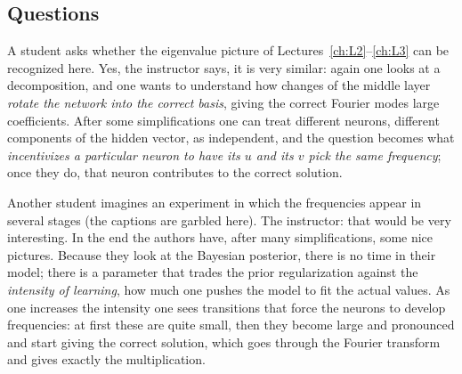 \subsection{Questions}\label{sec:L5-theory-q}
\begin{discussion}
A student asks whether the eigenvalue picture of Lectures~\ref{ch:L2}--\ref{ch:L3} can be recognized here. Yes, the instructor says, it is very similar: again one looks at a decomposition, and one wants to understand how changes of the middle layer \emph{rotate the network into the correct basis}, giving the correct Fourier modes large coefficients. After some simplifications one can treat different neurons, different components of the hidden vector, as independent, and the question becomes what \emph{incentivizes a particular neuron to have its $u$ and its $v$ pick the same frequency}; once they do, that neuron contributes to the correct solution.
\end{discussion}

\begin{discussion}
Another student imagines an experiment in which the frequencies appear in several stages (the captions are garbled here). The instructor: that would be very interesting. In the end the authors have, after many simplifications, some nice pictures. Because they look at the Bayesian posterior, there is no time in their model; there is a parameter that trades the prior regularization against the \emph{intensity of learning}, how much one pushes the model to fit the actual values. As one increases the intensity one sees transitions that force the neurons to develop frequencies: at first these are quite small, then they become large and pronounced and start giving the correct solution, which goes through the Fourier transform and gives exactly the multiplication.
\end{discussion}

